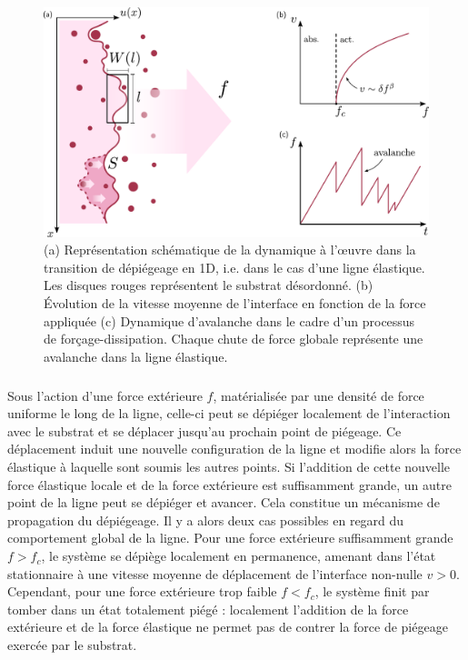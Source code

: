 \begin{figure}[h]
	\centering
	\includegraphics[width=\textwidth]{Chapitre1/Figures/Depinning/depinningbase.pdf}
	\caption{(a) Représentation schématique de la dynamique à l’œuvre dans la transition de dépiégeage en 1D, i.e. dans le cas d'une ligne élastique. Les disques rouges représentent le substrat désordonné. (b) Évolution de la vitesse moyenne de l'interface en fonction de la force appliquée (c) Dynamique d'avalanche dans le cadre d'un processus de forçage-dissipation. Chaque chute de force globale représente une avalanche dans la ligne élastique.}
	\label{fig:depinningbase}
\end{figure} 

\subparagraph{}Sous l'action d'une force extérieure $f$, matérialisée par une densité de force uniforme le long de la ligne,  celle-ci peut se dépiéger localement de l'interaction avec le substrat et se déplacer jusqu'au prochain point de piégeage. Ce déplacement induit une nouvelle configuration de la ligne et modifie alors la force élastique à laquelle sont soumis les autres points. Si l'addition de cette nouvelle force élastique locale et de la force extérieure est suffisamment grande, un autre point de la ligne peut se dépiéger et avancer. Cela constitue un mécanisme de propagation du dépiégeage. Il y a alors deux cas possibles en regard du comportement global de la ligne. Pour une force extérieure suffisamment grande $f>f_c$, le système se dépiège localement en permanence, amenant dans l'état stationnaire à une vitesse moyenne de déplacement de l'interface non-nulle $v>0$. Cependant, pour une force extérieure trop faible $f<f_c$, le système finit par tomber dans un état totalement piégé : localement l'addition de la force extérieure et de la force élastique ne permet pas de contrer la force de piégeage exercée par le substrat. 

